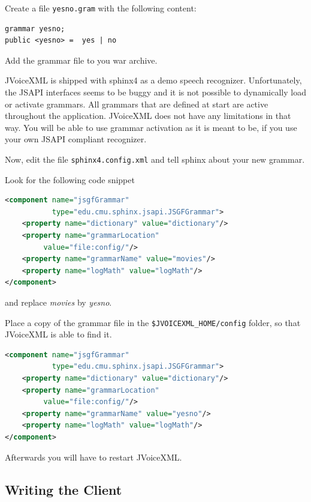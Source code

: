 \documentclass[11pt,a4paper]{article}
\begin{document}
Create a file \texttt{yesno.gram} with the following content:

\begin{lstlisting}
grammar yesno;
public <yesno> =  yes | no

\end{lstlisting}

Add the grammar file to you war archive.

JVoiceXML is shipped with sphinx4 as a demo speech recognizer. Unfortunately,
the JSAPI interfaces seems to be buggy and it is not possible to dynamically
load or activate grammars. All grammars that are defined at start are active 
throughout the application. JVoiceXML does not have any limitations in that way.
You will be able to use grammar activation as it is meant to be, if you use your
own JSAPI compliant recognizer.

Now, edit the file \texttt{sphinx4.config.xml} and tell sphinx about your new 
grammar.

Look for the following code snippet

\begin{lstlisting}[language=XML]
<component name="jsgfGrammar" 
           type="edu.cmu.sphinx.jsapi.JSGFGrammar">
    <property name="dictionary" value="dictionary"/>
    <property name="grammarLocation"
         value="file:config/"/>
    <property name="grammarName" value="movies"/>
    <property name="logMath" value="logMath"/>
</component>
\end{lstlisting}

and replace \emph{movies} by \emph{yesno}.

Place a copy of the grammar file in the \texttt{\$JVOICE\-XML\_HOME/config}
folder, so that JVoiceXML is able to find it.

\begin{lstlisting}[language=XML]
<component name="jsgfGrammar" 
           type="edu.cmu.sphinx.jsapi.JSGFGrammar">
    <property name="dictionary" value="dictionary"/>
    <property name="grammarLocation"
         value="file:config/"/>
    <property name="grammarName" value="yesno"/>
    <property name="logMath" value="logMath"/>
</component>
\end{lstlisting}

Afterwards you will have to restart JVoiceXML.

\subsection{Writing the Client}
\end{document}
